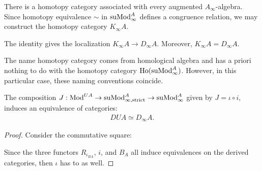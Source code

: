 \documentclass[../thesis.tex]{subfiles}
\begin{document}
            There is a homotopy category associated with every augmented $A_\infty$-algebra. Since homotopy equivalence $\sim$ in $\tt{suMod}_\infty^A$ defines a congruence relation, we may construct the homotopy category $K_\infty A$.

            \begin{corollary}
                The identity gives the localization $K_\infty A \to D_\infty A$. Moreover, $K_\infty A = D_\infty A$.
            \end{corollary}

            \begin{remark}
                The name homotopy category comes from homological algebra and has a priori nothing to do with the homotopy category $\tt{Ho}(\tt{suMod}_\infty^A)$. However, in this particular case, these naming conventions coincide.
            \end{remark}

            \begin{lemma}\label{lem: universal-enveloping-is-derived}
                The composition $J : \tt{Mod}^{UA} \to \tt{suMod}_{\infty, \tt{strict}}^A \to \tt{suMod}_\infty^A$ given by $J = \iota \circ i$, induces an equivalence of categories:
                \begin{align*}
                    DUA \simeq D_\infty A.
                \end{align*}
            \end{lemma}

            \begin{proof}
                Consider the commutative square:
                \begin{center}
                \end{center}

                Since the three functors $R_{\iota_{BA}}$, $i$, and $B_A$ all induce equivalences on the derived categories, then $\iota$ has to as well.
            \end{proof}
\end{document}
